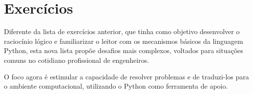 \chapter{Exercícios}\label{ex}

Diferente da lista de exercícios anterior, que tinha como objetivo desenvolver o raciocínio lógico e familiarizar o
leitor com os mecanismos básicos da linguagem Python, esta nova lista propõe desafios mais complexos, voltados para
situações comuns no cotidiano profissional de engenheiros.

O foco agora é estimular a capacidade de resolver problemas e de traduzi-los para o ambiente computacional, utilizando
o Python como ferramenta de apoio.


